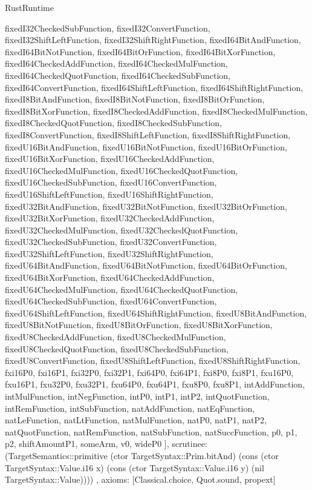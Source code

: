 \begin{lexlean}{RustRuntime}
\begin{semanticmodule}
{{      fixedI32CheckedSubFunction,
      fixedI32ConvertFunction,
      fixedI32ShiftLeftFunction,
      fixedI32ShiftRightFunction,
      fixedI64BitAndFunction,
      fixedI64BitNotFunction,
      fixedI64BitOrFunction,
      fixedI64BitXorFunction,
      fixedI64CheckedAddFunction,
      fixedI64CheckedMulFunction,
      fixedI64CheckedQuotFunction,
      fixedI64CheckedSubFunction,
      fixedI64ConvertFunction,
      fixedI64ShiftLeftFunction,
      fixedI64ShiftRightFunction,
      fixedI8BitAndFunction,
      fixedI8BitNotFunction,
      fixedI8BitOrFunction,
      fixedI8BitXorFunction,
      fixedI8CheckedAddFunction,
      fixedI8CheckedMulFunction,
      fixedI8CheckedQuotFunction,
      fixedI8CheckedSubFunction,
      fixedI8ConvertFunction,
      fixedI8ShiftLeftFunction,
      fixedI8ShiftRightFunction,
      fixedU16BitAndFunction,
      fixedU16BitNotFunction,
      fixedU16BitOrFunction,
      fixedU16BitXorFunction,
      fixedU16CheckedAddFunction,
      fixedU16CheckedMulFunction,
      fixedU16CheckedQuotFunction,
      fixedU16CheckedSubFunction,
      fixedU16ConvertFunction,
      fixedU16ShiftLeftFunction,
      fixedU16ShiftRightFunction,
      fixedU32BitAndFunction,
      fixedU32BitNotFunction,
      fixedU32BitOrFunction,
      fixedU32BitXorFunction,
      fixedU32CheckedAddFunction,
      fixedU32CheckedMulFunction,
      fixedU32CheckedQuotFunction,
      fixedU32CheckedSubFunction,
      fixedU32ConvertFunction,
      fixedU32ShiftLeftFunction,
      fixedU32ShiftRightFunction,
      fixedU64BitAndFunction,
      fixedU64BitNotFunction,
      fixedU64BitOrFunction,
      fixedU64BitXorFunction,
      fixedU64CheckedAddFunction,
      fixedU64CheckedMulFunction,
      fixedU64CheckedQuotFunction,
      fixedU64CheckedSubFunction,
      fixedU64ConvertFunction,
      fixedU64ShiftLeftFunction,
      fixedU64ShiftRightFunction,
      fixedU8BitAndFunction,
      fixedU8BitNotFunction,
      fixedU8BitOrFunction,
      fixedU8BitXorFunction,
      fixedU8CheckedAddFunction,
      fixedU8CheckedMulFunction,
      fixedU8CheckedQuotFunction,
      fixedU8CheckedSubFunction,
      fixedU8ConvertFunction,
      fixedU8ShiftLeftFunction,
      fixedU8ShiftRightFunction,
      fxi16P0,
      fxi16P1,
      fxi32P0,
      fxi32P1,
      fxi64P0,
      fxi64P1,
      fxi8P0,
      fxi8P1,
      fxu16P0,
      fxu16P1,
      fxu32P0,
      fxu32P1,
      fxu64P0,
      fxu64P1,
      fxu8P0,
      fxu8P1,
      intAddFunction,
      intMulFunction,
      intNegFunction,
      intP0,
      intP1,
      intP2,
      intQuotFunction,
      intRemFunction,
      intSubFunction,
      natAddFunction,
      natEqFunction,
      natLeFunction,
      natLtFunction,
      natMulFunction,
      natP0,
      natP1,
      natP2,
      natQuotFunction,
      natRemFunction,
      natSubFunction,
      natSuccFunction,
      p0,
      p1,
      p2,
      shiftAmountP1,
      someArm,
      v0,
      wideP0
    ],
    scrutinee: (TargetSemantics::primitive (ctor TargetSyntax::Prim.bitAnd) (cons (ctor TargetSyntax::Value.i16 x) (cons (ctor TargetSyntax::Value.i16 y) (nil TargetSyntax::Value))))
  },
  axioms: [Classical.choice, Quot.sound, propext]
}


\end{semanticmodule}
\end{lexlean}
